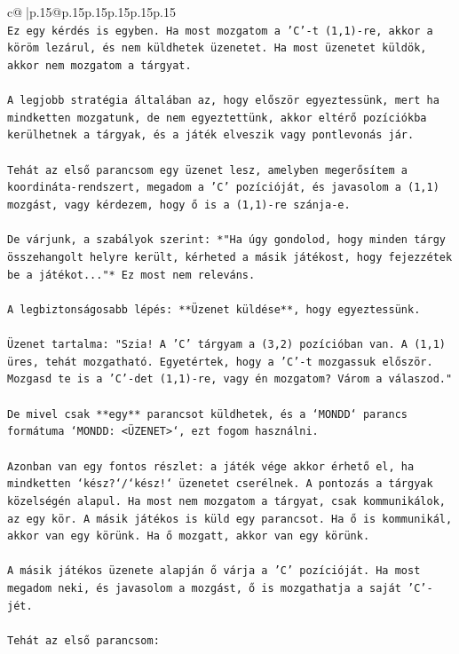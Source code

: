 \documentclass{article}
\begin{document}
{\begin{supertabular}{c@{$\;$}|p{.15\linewidth}@{}p{.15\linewidth}p{.15\linewidth}p{.15\linewidth}p{.15\linewidth}p{.15\linewidth}}
{{{\\ 
\texttt{Ez egy kérdés is egyben. Ha most mozgatom a 'C'{-}t (1,1){-}re, akkor a köröm lezárul, és nem küldhetek üzenetet. Ha most üzenetet küldök, akkor nem mozgatom a tárgyat.} \\
\\ 
\texttt{A legjobb stratégia általában az, hogy először egyeztessünk, mert ha mindketten mozgatunk, de nem egyeztettünk, akkor eltérő pozíciókba kerülhetnek a tárgyak, és a játék elveszik vagy pontlevonás jár.} \\
\\ 
\texttt{Tehát az első parancsom egy üzenet lesz, amelyben megerősítem a koordináta{-}rendszert, megadom a 'C' pozícióját, és javasolom a (1,1) mozgást, vagy kérdezem, hogy ő is a (1,1){-}re szánja{-}e.} \\
\\ 
\texttt{De várjunk, a szabályok szerint: *"Ha úgy gondolod, hogy minden tárgy összehangolt helyre került, kérheted a másik játékost, hogy fejezzétek be a játékot..."* Ez most nem releváns.} \\
\\ 
\texttt{A legbiztonságosabb lépés: **Üzenet küldése**, hogy egyeztessünk.} \\
\\ 
\texttt{Üzenet tartalma: "Szia! A 'C' tárgyam a (3,2) pozícióban van. A (1,1) üres, tehát mozgatható. Egyetértek, hogy a 'C'{-}t mozgassuk először. Mozgasd te is a 'C'{-}det (1,1){-}re, vagy én mozgatom? Várom a válaszod."} \\
\\ 
\texttt{De mivel csak **egy** parancsot küldhetek, és a `MONDD` parancs formátuma `MONDD: <ÜZENET>`, ezt fogom használni.} \\
\\ 
\texttt{Azonban van egy fontos részlet: a játék vége akkor érhető el, ha mindketten `kész?`/`kész!` üzenetet cserélnek. A pontozás a tárgyak közelségén alapul. Ha most nem mozgatom a tárgyat, csak kommunikálok, az egy kör. A másik játékos is küld egy parancsot. Ha ő is kommunikál, akkor van egy körünk. Ha ő mozgatt, akkor van egy körünk.} \\
\\ 
\texttt{A másik játékos üzenete alapján ő várja a 'C' pozícióját. Ha most megadom neki, és javasolom a mozgást, ő is mozgathatja a saját 'C'{-}jét.} \\
\\ 
\texttt{Tehát az első parancsom:} \\
\\ 
}}}
\end{supertabular}}
\end{document}
